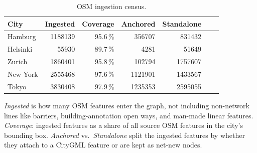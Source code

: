 \documentclass[sigconf,authordraft]{acmart}
\begin{document}
\begin{table}[h!]
  \caption{OSM ingestion census.}
  \label{tab:osm_census}
  \begin{tabular}{lrrrrrr}
    \toprule
    City & Ingested & Coverage & Anchored & Standalone \\
    \midrule
    Hamburg  & \num{1188139} & 95.6\,\% & \num{356707} & \num{831432} \\
    Helsinki & \num{55930}   & 89.7\,\% & \num{4281}   & \num{51649} \\
    Zurich   & \num{1860401} & 95.8\,\% & \num{102794} & \num{1757607} \\
    New York & \num{2555468} & 97.6\,\% & \num{1121901} & \num{1433567} \\
    Tokyo    & \num{3830408} & 97.9\,\% & \num{1235353} & \num{2595055} \\
    \bottomrule
  \end{tabular}

  \smallskip\raggedright\footnotesize
  \emph{Ingested} is how many OSM features enter the graph, not including non-network lines like barriers, building-annotation open ways, and man-made linear features.
  \emph{Coverage}: ingested features as a share of all source OSM features in the city's bounding box. 
  \emph{Anchored} vs.\ \emph{Standalone} split the ingested features by whether they attach to a CityGML feature or are kept as net-new nodes.
\end{table}
\end{document}
